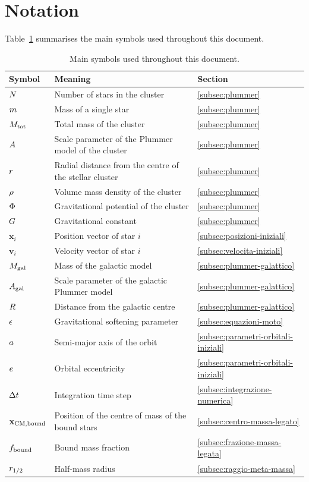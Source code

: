 \section{Notation}
\label{sec:notazione}
Table~\ref{tab:notazione} summarises the main symbols used throughout this document.
\begin{table}[H]
	\centering
	\small
	\caption{Main symbols used throughout this document.}
	\label{tab:notazione}
	\begin{tabular}{p{}p{}p{}}
		\hline
		\textbf{Symbol} & \textbf{Meaning} & \textbf{Section} \\
		\hline
		$N$ & Number of stars in the cluster & \ref{subsec:plummer} \\
		$m$ & Mass of a single star & \ref{subsec:plummer} \\
		$M_{\mathrm{tot}}$ & Total mass of the cluster & \ref{subsec:plummer} \\
		$A$ & Scale parameter of the Plummer model of the cluster & \ref{subsec:plummer} \\
		$r$ & Radial distance from the centre of the stellar cluster & \ref{subsec:plummer} \\
		$\rho$ & Volume mass density of the cluster & \ref{subsec:plummer} \\
		$\Phi$ & Gravitational potential of the cluster & \ref{subsec:plummer} \\
		$G$ & Gravitational constant & \ref{subsec:plummer} \\
		$\mathbf{x}_i$ & Position vector of star $i$ & \ref{subsec:posizioni-iniziali} \\
		$\mathbf{v}_i$ & Velocity vector of star $i$ & \ref{subsec:velocita-iniziali} \\
		$M_{\mathrm{gal}}$ & Mass of the galactic model & \ref{subsec:plummer-galattico} \\
		$A_{\mathrm{gal}}$ & Scale parameter of the galactic Plummer model & \ref{subsec:plummer-galattico} \\
		$R$ & Distance from the galactic centre & \ref{subsec:plummer-galattico} \\
		$\epsilon$ & Gravitational softening parameter & \ref{subsec:equazioni-moto} \\
		$a$ & Semi-major axis of the orbit & \ref{subsec:parametri-orbitali-iniziali} \\
		$e$ & Orbital eccentricity & \ref{subsec:parametri-orbitali-iniziali} \\
		$\Delta t$ & Integration time step & \ref{subsec:integrazione-numerica} \\
		$\mathbf{x}_{\mathrm{CM,bound}}$ & Position of the centre of mass of the bound stars & \ref{subsec:centro-massa-legato} \\
		$f_{\mathrm{bound}}$ & Bound mass fraction & \ref{subsec:frazione-massa-legata} \\
		$r_{1/2}$ & Half-mass radius & \ref{subsec:raggio-meta-massa} \\
		\hline
	\end{tabular}
\end{table}
